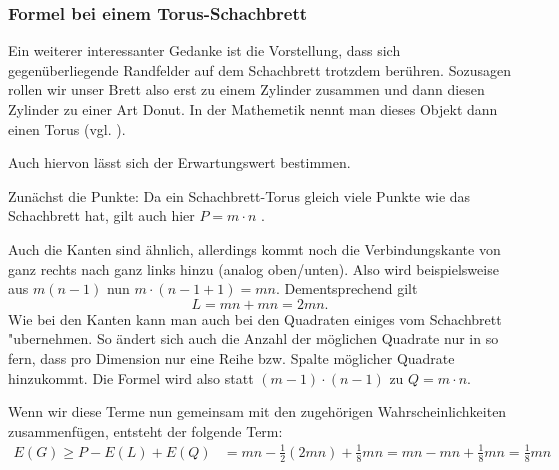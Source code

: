 \documentclass[11pt,a4paper]{article}
\numberwithin{equation}{section}
\numberwithin{table}{section}
\numberwithin{figure}{section}
\begin{document}
\subsubsection{Formel bei einem Torus-Schachbrett}
Ein weiterer interessanter Gedanke ist die Vorstellung, dass sich gegenüberliegende Randfelder auf dem Schachbrett trotzdem berühren. Sozusagen rollen wir unser Brett also erst zu einem Zylinder zusammen und dann diesen Zylinder zu einer Art Donut. In der Mathemetik nennt man dieses Objekt dann einen Torus (vgl. \cite{torus}).\par\noindent
Auch hiervon lässt sich der Erwartungswert bestimmen.\par\noindent
Zunächst die Punkte: Da ein Schachbrett-Torus gleich viele Punkte wie das Schachbrett hat, gilt auch hier $P=m\cdot n$ .\par\noindent
Auch die Kanten sind ähnlich, allerdings kommt noch die Verbindungskante von ganz rechts nach ganz links hinzu (analog oben/unten). Also wird beispielsweise aus $m(n-1)$ nun $m\cdot(n-1+1)=mn$. Dementsprechend gilt
$$L=mn+mn=2mn.$$
Wie bei den Kanten kann man auch bei den Quadraten einiges vom Schachbrett "ubernehmen. So ändert sich auch die Anzahl der möglichen Quadrate nur in so fern, dass pro Dimension nur eine Reihe bzw. Spalte möglicher Quadrate hinzukommt. Die Formel wird also statt $(m-1)\cdot(n-1)$  zu $Q=m\cdot n$.\par\noindent
Wenn wir diese Terme nun gemeinsam mit den zugehörigen Wahrscheinlichkeiten zusammenfügen, entsteht der folgende Term:
\begin{align*}
E(G)\geq P-E(L)+E(Q)&=mn-\frac{1}{2}(2mn)+\frac{1}{8}mn=mn-mn+\frac{1}{8}mn =\frac{1}{8}mn
\end{align*}
\end{document}
